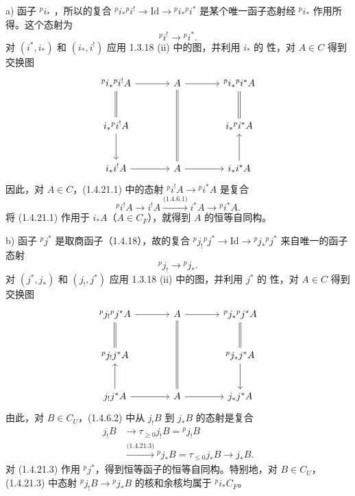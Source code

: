 a) 函子 ${}^pi_*$ ，所以的复合 ${}^pi_*{}^pi^!\to\mathrm{Id}\to{}^pi_*{}^pi^*$ 是某个唯一函子态射经 ${}^pi_*$ 作用所得。这个态射为
\begin{equation*}
{}^pi^!\longrightarrow{}^pi^*.\tag{1.4.21.1}
\end{equation*}
对 $(i^*,i_*)$ 和 $(i_*,i^!)$ 应用 1.3.18 (ii) 中的图，并利用 $i_*$ 的 性，对 $A\in C$ 得到交换图
\[
\begin{tikzcd}[ampersand replacement=\&,column sep=large,row sep=large]
{}^pi_*{}^pi^!A\arrow[r]\arrow[d,equal]\&A\arrow[r]\arrow[dd,equal]\&{}^pi_*{}^pi^*A\arrow[d,equal]\\
i_*{}^pi^!A\arrow[d]\&\&i_*{}^pi^*A\\
i_*i^!A\arrow[r]\&A\arrow[r]\&i_*i^*A\arrow[u]
\end{tikzcd}
\]
因此，对 $A\in C$，(1.4.21.1) 中的态射 ${}^pi^!A\to{}^pi^*A$ 是复合
\begin{equation*}
{}^pi^!A\longrightarrow i^!A\xrightarrow{\text{(1.4.6.1)}}i^*A
 \longrightarrow{}^pi^*A.\tag{1.4.21.2}
\end{equation*}
将 (1.4.21.1) 作用于 $i_*A$（$A\in C_F$），就得到 $A$ 的恒等自同构。

b) 函子 ${}^pj^*$ 是取商函子（1.4.18），故的复合 ${}^pj_!{}^pj^*\to\mathrm{Id}\to{}^pj_*{}^pj^*$ 来自唯一的函子态射
\begin{equation*}
{}^pj_!\longrightarrow{}^pj_*.\tag{1.4.21.3}
\end{equation*}
对 $(j^*,j_*)$ 和 $(j_!,j^*)$ 应用 1.3.18 (ii) 中的图，并利用 $j^*$ 的 性，对 $A\in C$ 得到交换图
\[
\begin{tikzcd}[ampersand replacement=\&,column sep=large,row sep=large]
{}^pj_!{}^pj^*A\arrow[r]\arrow[d,equal]\&A\arrow[r]\arrow[dd,equal]\&{}^pj_*{}^pj^*A\arrow[d,equal]\\
{}^pj_!j^*A\&\&{}^pj_*j^*A\arrow[d]\\
j_!j^*A\arrow[u]\arrow[r]\&A\arrow[r]\&j_*j^*A
\end{tikzcd}
\]
由此，对 $B\in C_U$，(1.4.6.2) 中从 $j_!B$ 到 $j_*B$ 的态射是复合
\begin{equation*}
\begin{aligned}
j_!B&\longrightarrow\tau_{\ge0}j_!B={}^pj_!B\\
&\xrightarrow{\text{(1.4.21.3)}}{}^pj_*B=\tau_{\le0}j_*B
 \longrightarrow j_*B.
\end{aligned}\tag{1.4.21.4}
\end{equation*}
对 (1.4.21.3) 作用 ${}^pj^*$，得到恒等函子的恒等自同构。特别地，对 $B\in C_U$，(1.4.21.3) 中态射 ${}^pj_!B\to{}^pj_*B$ 的核和余核均属于 ${}^pi_*C_F$。

